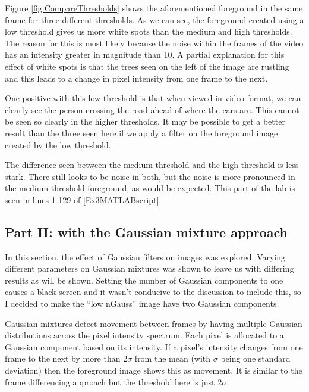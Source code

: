 \documentclass[11pt, letterpaper]{article}
\begin{document}
Figure \ref{fig:CompareThresholds} shows the aforementioned foreground in the same frame for three different thresholds. As we can see, the foreground created using a low threshold gives us more white spots than the medium and high thresholds. The reason for this is most likely because the noise within the frames of the video has an intensity greater in magnitude than 10. A partial explanation for this effect of white spots is that the trees seen on the left of the image are rustling and this leads to a change in pixel intensity from one frame to the next.

One positive with this low threshold is that when viewed in video format, we can clearly see the person crossing the road ahead of where the cars are. This cannot be seen so clearly in the higher thresholds. It may be possible to get a better result than the three seen here if we apply a filter on the foreground image created by the low threshold.

The difference seen between the medium threshold and the high threshold is less stark. There still looks to be noise in both, but the noise is more pronounced in the medium threshold foreground, as would be expected. This part of the lab is seen in lines 1-129 of \ref{Ex3MATLABscript}.

\subsection{Part II: with the Gaussian mixture approach}
In this section, the effect of Gaussian filters on images was explored. Varying different parameters on Gaussian mixtures was shown to leave us with differing results as will be shown. Setting the number of Gaussian components to one causes a black screen and it wasn't conducive to the discussion to include this, so I decided to make the ``low nGauss'' image have two Gaussian components.

Gaussian mixtures detect movement between frames by having multiple Gaussian distributions across the pixel intensity spectrum. Each pixel is allocated to a Gaussian component based on its intensity. If a pixel's intensity changes from one frame to the next by more than 2\begin{math}\sigma\end{math} from the mean (with \begin{math}\sigma\end{math} being one standard deviation) then the foreground image shows this as movement. It is similar to the frame differencing approach but the threshold here is just 2$\sigma$. 
\end{document}
